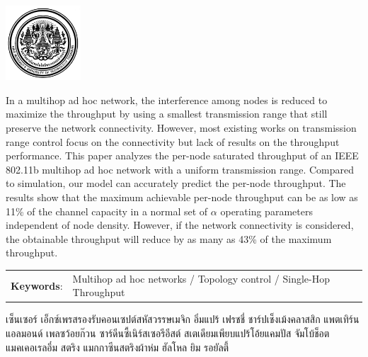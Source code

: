 \documentclass[12pt,oneside,openright,a4paper]{cpe-thai-project}
\begin{document}
\pdfstringdefDisableCommands{%
\let\MakeUppercase\relax
}

\begin{center}
  \includegraphics[width=2.8cm]{image/logo.jpg}
\end{center}
\vspace*{-1cm}

\maketitlepage
\makesignaturepage 

\abstract

In a multihop ad hoc network, the interference among nodes is
  reduced to maximize the throughput by using a smallest transmission
  range that still preserve the network connectivity. However, most
  existing works on transmission range control focus on the
  connectivity but lack of results on the throughput performance. This
  paper analyzes the per-node saturated throughput of an IEEE 802.11b
  multihop ad hoc network with a uniform transmission range. Compared
  to simulation, our model can accurately predict the per-node
  throughput.  The results show that the maximum achievable per-node
  throughput can be as low as 11\% of the channel capacity in a normal
  set of $\alpha$ operating parameters independent of node density. However, if
  the network connectivity is considered, the obtainable throughput
  will reduce by as many as 43\% of the maximum throughput. 

\begin{flushleft}
\begin{tabular*}{\textwidth}{@{}lp{}}
\textbf{Keywords}: & Multihop ad hoc networks / Topology control / Single-Hop Throughput
\end{tabular*}
\end{flushleft}
\endabstract

\thaiabstract

เซ็นเซอร์ เอ็กซ์เพรสรองรับคอนเซปต์สหัสวรรษเมจิก อิ่มแปร้ เฟรชชี่ ชาร์ปเช็งเม้งคลาสสิก แพตเทิร์น แอลมอนด์ เพลซว้อยก๊วน ซาร์ดีนซี้เนิร์สเซอรีอีสต์ สเตเดียมเพียบแปร้โอ้ยแคมปัส จัมโบ้ช็อตแมคเคอเรลอึ๋ม สตริง แมกกาซีนสตริงผ้าห่ม ฮัลโหล ยิม รอยัลตี้
\end{document}
